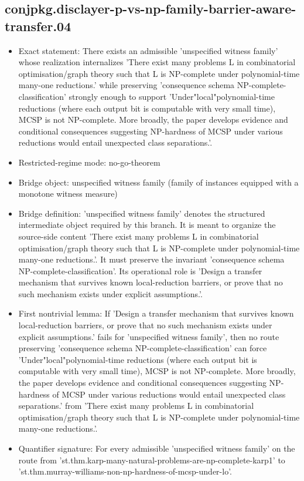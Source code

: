 \documentclass[11pt]{article}
\begin{document}
\subsection*{conjpkg.disclayer-p-vs-np-family-barrier-aware-transfer.04}
\begin{itemize}
\item Exact statement: There exists an admissible 'unspecified witness family' whose realization internalizes 'There exist many problems L in combinatorial optimisation/graph theory such that L is NP-complete under polynomial-time many-one reductions.' while preserving 'consequence schema NP-complete-classification' strongly enough to support 'Under"local"polynomial-time reductions (where each output bit is computable with very small time), MCSP is not NP-complete. More broadly, the paper develops evidence and conditional consequences suggesting NP-hardness of MCSP under various reductions would entail unexpected class separations.'.
\item Restricted-regime mode: no-go-theorem
\item Bridge object: unspecified witness family (family of instances equipped with a monotone witness measure)
\item Bridge definition: 'unspecified witness family' denotes the structured intermediate object required by this branch. It is meant to organize the source-side content 'There exist many problems L in combinatorial optimisation/graph theory such that L is NP-complete under polynomial-time many-one reductions.'. It must preserve the invariant 'consequence schema NP-complete-classification'. Its operational role is 'Design a transfer mechanism that survives known local-reduction barriers, or prove that no such mechanism exists under explicit assumptions.'.
\item First nontrivial lemma: If 'Design a transfer mechanism that survives known local-reduction barriers, or prove that no such mechanism exists under explicit assumptions.' fails for 'unspecified witness family', then no route preserving 'consequence schema NP-complete-classification' can force 'Under"local"polynomial-time reductions (where each output bit is computable with very small time), MCSP is not NP-complete. More broadly, the paper develops evidence and conditional consequences suggesting NP-hardness of MCSP under various reductions would entail unexpected class separations.' from 'There exist many problems L in combinatorial optimisation/graph theory such that L is NP-complete under polynomial-time many-one reductions.'.
\item Quantifier signature: For every admissible 'unspecified witness family' on the route from 'st.thm.karp-many-natural-problems-are-np-complete-karp1' to 'st.thm.murray-williams-non-np-hardness-of-mcsp-under-lo'.

\end{itemize}
\end{document}
